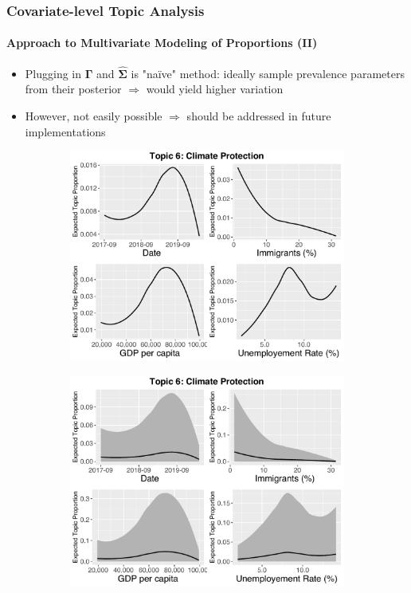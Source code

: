 \documentclass[xcolor=dvipsnames]{beamer}
\begin{document}
\begin{frame}
\frametitle{Covariate-level Topic Analysis}
\framesubtitle{Approach to Multivariate Modeling of Proportions (II)}
\begin{itemize}
\item Plugging in $\boldsymbol{\Gamma}$ and $\hat{\boldsymbol{\Sigma}}$ is "na{\"i}ve" method: ideally sample prevalence parameters from their posterior $\Rightarrow$ would yield higher variation
\item However, not easily possible $\Rightarrow$ should be addressed in future implementations
\end{itemize}
\begin{figure}[h!]
  \centering
  \captionsetup{justification=centering}
  \begin{subfigure}[b]{0.4\linewidth}
    \includegraphics[width=\linewidth]{../plots/presentation/direct_t6_without_credible.pdf}
  \end{subfigure}
  \begin{subfigure}[b]{0.4\linewidth}
    \includegraphics[width=\linewidth]{../plots/presentation/direct_t6_with_credible.pdf}
  \end{subfigure}
\end{figure}
\end{frame}
\end{document}
